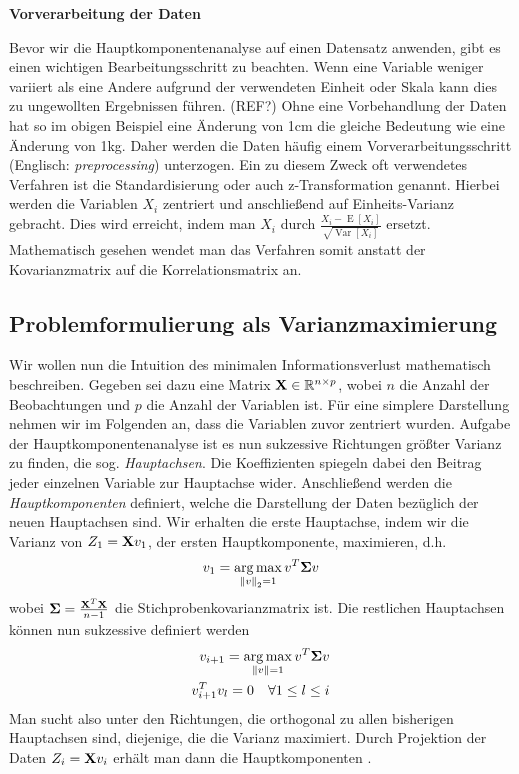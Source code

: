 \textbf{Vorverarbeitung der Daten}

Bevor wir die Hauptkomponentenanalyse auf einen Datensatz anwenden, gibt es einen wichtigen Bearbeitungsschritt zu beachten. Wenn eine Variable weniger variiert als eine Andere aufgrund der verwendeten Einheit oder Skala kann dies zu ungewollten Ergebnissen führen. (REF?) Ohne eine Vorbehandlung der Daten hat so im obigen Beispiel eine Änderung von 1cm die gleiche Bedeutung wie eine Änderung von 1kg.  Daher werden die Daten häufig einem Vorverarbeitungsschritt (Englisch: \textit{preprocessing}) unterzogen. Ein zu diesem Zweck oft verwendetes Verfahren ist die Standardisierung oder auch z-Transformation genannt. Hierbei werden die Variablen $X_i$ zentriert und anschließend auf Einheits-Varianz gebracht. Dies wird erreicht, indem man $X_i$ durch $\frac{X_i - \operatorname{E}[X_i]}{\sqrt{\operatorname{Var}[X_i]}}$ ersetzt. Mathematisch gesehen wendet man das Verfahren somit anstatt der Kovarianzmatrix auf die Korrelationsmatrix an.

\subsection{Problemformulierung als Varianzmaximierung}

Wir wollen nun die Intuition des minimalen Informationsverlust mathematisch beschreiben. Gegeben sei dazu eine Matrix $\mathbf{X} \in \mathbb{R}^{n\times p}$, wobei $n$ die Anzahl der Beobachtungen und $p$ die Anzahl der Variablen ist. Für eine simplere Darstellung nehmen wir im Folgenden an, dass die Variablen zuvor zentriert wurden. Aufgabe der Hauptkomponentenanalyse ist es nun sukzessive Richtungen größter Varianz zu finden, die sog. \textit{Hauptachsen}. Die Koeffizienten spiegeln dabei den Beitrag jeder einzelnen Variable zur Hauptachse wider. Anschließend werden die \textit{Hauptkomponenten} definiert, welche die Darstellung der Daten bezüglich der neuen Hauptachsen sind. Wir erhalten die erste Hauptachse, indem wir die Varianz von $Z_1 = \mathbf{X}v_1$, der ersten Hauptkomponente, maximieren, d.h.
\begin{align}
\label{pca_variance_maximization_first}
v_1 = \operatorname*{arg\,max}_{\left\lVert v \right\rVert_2 = 1} v^T \mathbf{\Sigma} v
\end{align}
wobei $\mathbf{\Sigma} = \frac{\mathbf{X}^T\mathbf{X}}{n-1}$ die Stichprobenkovarianzmatrix ist. Die restlichen Hauptachsen können nun sukzessive definiert werden
\begin{align}
\label{pca_variance_maximization_rest}
\begin{split}
v_{i+1} = \operatorname*{arg\,max}_{\left\lVert v \right\rVert = 1} v^T \mathbf{\Sigma} v\\
v_{i+1}^Tv_l = 0 \quad \forall 1 \leq l \leq i
\end{split}
\end{align}
Man sucht also unter den Richtungen, die orthogonal zu allen bisherigen Hauptachsen sind, diejenige, die die Varianz maximiert. Durch Projektion der Daten $Z_i = \mathbf{X}v_i$ erhält man dann die Hauptkomponenten \cite{vidal}.


